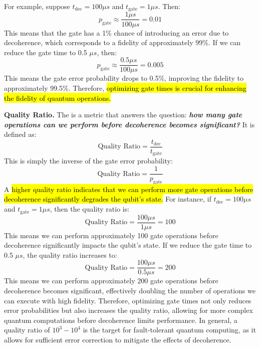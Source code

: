 For example, suppose $t_{\text{dec}} = 100 \mu s$ and $t_{\text{gate}} = 1 \mu s$. Then:
\begin{equation*}
    p_{\text{gate}} \approx \frac{1 \mu s}{100 \mu s} = 0.01
\end{equation*}
This means that the gate has a 1\% chance of introducing an error due to decoherence, which corresponds to a fidelity of approximately 99\%. If we can reduce the gate time to 0.5 $\mu s$, then:
\begin{equation*}
    p_{\text{gate}} \approx \frac{0.5 \mu s}{100 \mu s} = 0.005
\end{equation*}
This means the gate error probability drops to 0.5\%, improving the fidelity to approximately 99.5\%. Therefore, \hl{optimizing gate times is crucial for enhancing the fidelity of quantum operations.}

\highspace
\textcolor{Green3}{ \textbf{Quality Ratio.}} The  is a metric that answers the question: \emph{\textbf{how many gate operations can we perform before decoherence becomes significant?}} It is defined as:
\begin{equation}
    \text{Quality Ratio} = \frac{t_{\text{dec}}}{t_{\text{gate}}}
\end{equation}
This is simply the inverse of the gate error probability:
\begin{equation*}
    \text{Quality Ratio} = \frac{1}{p_{\text{gate}}}
\end{equation*}
A \hl{higher quality ratio indicates that we can perform more gate operations before decoherence significantly degrades the qubit's state.} For instance, if $t_{\text{dec}} = 100 \mu s$ and $t_{\text{gate}} = 1 \mu s$, then the quality ratio is:
\begin{equation*}
    \text{Quality Ratio} = \frac{100 \mu s}{1 \mu s} = 100
\end{equation*}
This means we can perform approximately 100 gate operations before decoherence significantly impacts the qubit's state. If we reduce the gate time to 0.5 $\mu s$, the quality ratio increases to:
\begin{equation*}
    \text{Quality Ratio} = \frac{100 \mu s}{0.5 \mu s} = 200
\end{equation*}
This means we can perform approximately 200 gate operations before decoherence becomes significant, effectively doubling the number of operations we can execute with high fidelity. Therefore, optimizing gate times not only reduces error probabilities but also increases the quality ratio, allowing for more complex quantum computations before decoherence limits performance. In general, a quality ratio of $10^{3} - 10^{4}$ is the target for fault-tolerant quantum computing, as it allows for sufficient error correction to mitigate the effects of decoherence.

